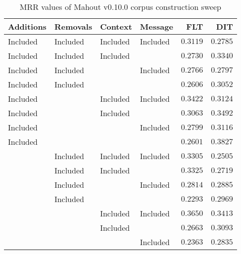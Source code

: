 
\begin{table}
\begin{spacing}{1.2}
\centering
\caption{MRR values of Mahout v0.10.0 corpus construction sweep}
\label{table:mahout_corpus_sweep}
\vspace{0.2em}
\begin{tabular}{llll|rr}
\toprule
Additions &  Removals &   Context &   Message & FLT &        DIT \\
\midrule
 Included &  Included &  Included &  Included &         $0.3119$ &      $0.2785$ \\
 \myrowcolor Included &  Included &  Included &           &         $0.2730$ &      $0.3340$ \\
 Included &  Included &           &  Included &         $0.2766$ &      $0.2797$ \\
 Included &  Included &           &           &         $0.2606$ &      $0.3052$ \\
 Included &           &  Included &  Included &         $0.3422$ &      $0.3124$ \\
 Included &           &  Included &           &         $0.3063$ &      $0.3492$ \\
 Included &           &           &  Included &         $0.2799$ &      $0.3116$ \\
 Included &           &           &           &         $0.2601$ & $\bm{0.3827}$ \\
          &  Included &  Included &  Included &         $0.3305$ &      $0.2505$ \\
          &  Included &  Included &           &         $0.3325$ &      $0.2719$ \\
          &  Included &           &  Included &         $0.2814$ &      $0.2885$ \\
          &  Included &           &           &         $0.2293$ &      $0.2969$ \\
          &           &  Included &  Included &    $\bm{0.3650}$ &      $0.3413$ \\
          &           &  Included &           &         $0.2663$ &      $0.3093$ \\
          &           &           &  Included &         $0.2363$ &      $0.2835$ \\
\bottomrule
\end{tabular}

\end{spacing}
\end{table}
